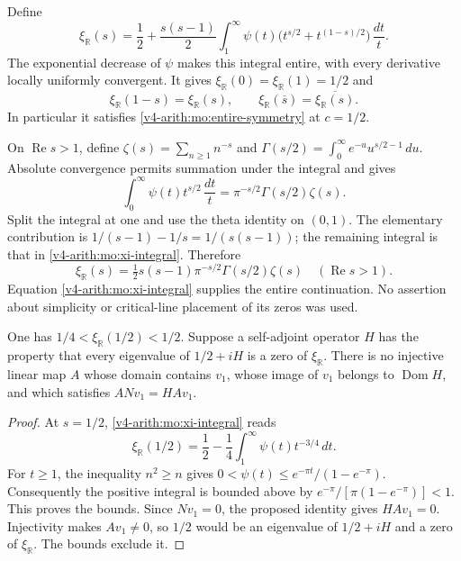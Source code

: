 Define
\begin{equation}
 \xi_{\mathbb R}(s)=\frac12+
 \frac{s(s-1)}2\int_1^\infty
 \psi(t)\bigl(t^{s/2}+t^{(1-s)/2}\bigr)\,\frac{dt}{t}.
 \label{v4-arith:mo:xi-integral}
\end{equation}
The exponential decrease of $\psi$ makes this integral entire,
with every derivative locally uniformly convergent. It gives
$\xi_{\mathbb R}(0)=\xi_{\mathbb R}(1)=1/2$ and
\[
 \xi_{\mathbb R}(1-s)=\xi_{\mathbb R}(s),\qquad
 \xi_{\mathbb R}(\overline s)=\overline{\xi_{\mathbb R}(s)}.
\]
In particular it satisfies \eqref{v4-arith:mo:entire-symmetry} at $c=1/2$.

On $\operatorname{Re}s>1$, define
$\zeta(s)=\sum_{n\geq1}n^{-s}$ and
$\Gamma(s/2)=\int_0^\infty e^{-u}u^{s/2-1}\,du$.
Absolute convergence permits summation under the integral and gives
\[
 \int_0^\infty\psi(t)t^{s/2}\,\frac{dt}{t}
       =\pi^{-s/2}\Gamma(s/2)\zeta(s).
\]
Split the integral at one and use the theta identity on $(0,1)$.
The elementary contribution is
$1/(s-1)-1/s=1/(s(s-1))$; the remaining integral is that in
\eqref{v4-arith:mo:xi-integral}. Therefore
\[
 \xi_{\mathbb R}(s)=
 \tfrac12s(s-1)\pi^{-s/2}\Gamma(s/2)\zeta(s)
 \quad(\operatorname{Re}s>1).
\]
Equation \eqref{v4-arith:mo:xi-integral} supplies the entire continuation.
No assertion about simplicity or critical-line placement of its
zeros was used.

\begin{proposition}
\label{v4-arith:mo:vacuum}
One has $1/4<\xi_{\mathbb R}(1/2)<1/2$.
Suppose a self-adjoint operator $H$ has the property that every
eigenvalue of $1/2+iH$ is a zero of $\xi_{\mathbb R}$.
There is no injective linear map $A$ whose domain contains $v_1$,
whose image of $v_1$ belongs to $\operatorname{Dom}H$, and which
satisfies $ANv_1=HAv_1$.
\end{proposition}
\begin{proof}
At $s=1/2$, \eqref{v4-arith:mo:xi-integral} reads
\[
 \xi_{\mathbb R}(1/2)=\frac12-
          \frac14\int_1^\infty\psi(t)t^{-3/4}\,dt.
\]
For $t\geq1$, the inequality $n^2\geq n$ gives
$0<\psi(t)\leq e^{-\pi t}/(1-e^{-\pi})$.
Consequently the positive integral is bounded above by
$e^{-\pi}/[\pi(1-e^{-\pi})]<1$. This proves the bounds.
Since $Nv_1=0$, the proposed identity gives $HAv_1=0$.
Injectivity makes $Av_1\ne0$, so $1/2$ would be an eigenvalue
of $1/2+iH$ and a zero of $\xi_{\mathbb R}$. The bounds exclude it.
\end{proof}

